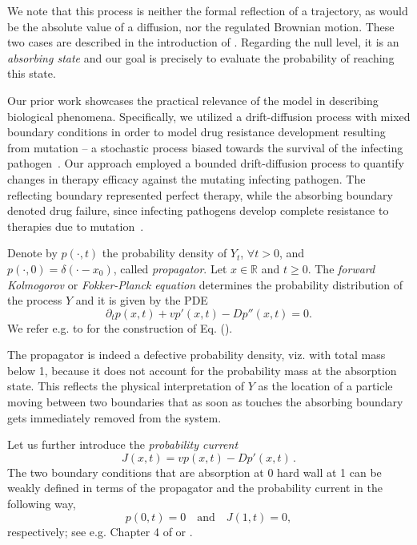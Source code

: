 \documentclass[preprint,12pt]{elsarticle}
\numberwithin{equation}{section}
\theoremstyle{plain} \newtheorem{theorem}{Theorem}[section]
\theoremstyle{plain} \newtheorem{proposition}[theorem]{Proposition}
\theoremstyle{plain} \newtheorem{lemma}[theorem]{Lemma}
\theoremstyle{plain} \newtheorem{corollary}[theorem]{Corollary}
\theoremstyle{definition} \newtheorem{definition}[theorem]{Definition}
\theoremstyle{definition} \newtheorem{notation}[theorem]{Notation}
\theoremstyle{remark} \newtheorem{remark}[theorem]{Remark}
\theoremstyle{remark} \newtheorem{remarks}[theorem]{Remarks}
\theoremstyle{remark} \newtheorem{algorithm2}[theorem]{Algorithm}
\theoremstyle{remark} \newtheorem{example}[theorem]{Example}
\newcommand{\R}{\mathbb{R}}
\begin{document}
We note that this process is neither the formal reflection of a trajectory, as would be the absolute value of a diffusion, nor the regulated Brownian motion. These two cases are described in the introduction of \cite{harrisonBrownianMotionStochastic1985}. 
Regarding the null level, it is an \emph{absorbing state} and our
goal is precisely to evaluate the probability of reaching this state.

Our prior work \cite{ramoso_stochastic_2020} showcases the practical 
relevance of the model in describing biological phenomena. Specifically, we utilized a drift-diffusion process with mixed boundary conditions in order to model drug resistance development resulting from mutation -- a stochastic process biased towards the survival of the infecting pathogen~\cite{MANRUBIA2006, Pillay1998}. Our approach employed a bounded drift-diffusion process to quantify changes in therapy efficacy against the mutating infecting pathogen. The reflecting boundary represented perfect therapy, while the absorbing boundary denoted drug failure, since infecting pathogens develop complete resistance to therapies due to mutation~\cite{Clutter2016}.

Denote by $p(\cdot,t)$
the probability density of $Y_t$, $\forall t >0$,
and $p(\cdot,0)= \delta(\cdot-x_0)$, called \emph{propagator}.
Let $x \in \R$ and $t \ge0$.
The {\it forward Kolmogorov} or {\it Fokker-Planck equation} determines
the probability distribution of the process $Y$ and it is given by the PDE
\begin{equation}
\label{eq:fke}
	\partial_t{p}(x,t)+vp'(x,t)-Dp''(x,t)=0.
\end{equation}
We refer e.g. to \cite{cox65theory}
for the construction of Eq. ().

The propagator is indeed a defective probability density, viz.
with total mass below 1, because it does not account for the probability mass at the absorption state.
This reflects the physical interpretation of $Y$ as the location of a particle moving between
two boundaries that as soon as touches the absorbing boundary gets immediately removed from
the system.

Let us further introduce the \emph{probability current}
\begin{equation} \label{eq:probcurrent}
	J(x,t)=vp(x,t)- Dp'(x,t)\,.
\end{equation}
The two boundary conditions that are  
absorption at 0
hard wall at 1 can be weakly defined in terms of the propagator and the probability current in the following way,
\begin{equation}
\label{eq:bc}
	p(0,t) = 0 \quad \text{and} \quad J(1,t)=0,
\end{equation}
respectively;
see e.g. Chapter 4 of \cite{pavliotis_stochastic_2014} or \cite{redner2001guide}.
\end{document}
